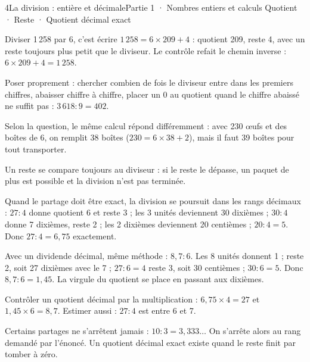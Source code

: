 \begin{ouverture}[calcul]{4}{La division : entière et décimale}{Partie 1 · Nombres entiers et calculs}
{Quotient · Reste · Quotient décimal exact}
\end{ouverture}
\pagestyle{otMain}\essentiel\fontsize{11}{15}\selectfont
{}\label{cours-4-1}
\begin{definition}Diviser 1\,258 par 6, c’est écrire $1\,258=6\times209+4$ : quotient 209, reste 4, avec un reste toujours plus petit que le diviseur. Le contrôle refait le chemin inverse : $6\times209+4=1\,258$.\end{definition}
\begin{savoirfaire}Poser proprement : chercher combien de fois le diviseur entre dans les premiers chiffres, abaisser chiffre à chiffre, placer un 0 au quotient quand le chiffre abaissé ne suffit pas : $3\,618:9=402$.\end{savoirfaire}
\begin{exemple}Selon la question, le même calcul répond différemment : avec 230 œufs et des boîtes de 6, on remplit 38 boîtes ($230=6\times38+2$), mais il faut 39 boîtes pour tout transporter.\end{exemple}
\begin{attention}Un reste se compare toujours au diviseur : si le reste le dépasse, un paquet de plus est possible et la division n’est pas terminée.\end{attention}
\clearpage
{}\label{cours-4-2}
\begin{definition}Quand le partage doit être exact, la division se poursuit dans les rangs décimaux : $27:4$ donne quotient 6 et reste 3 ; les 3 unités deviennent 30 dixièmes ; $30:4$ donne 7 dixièmes, reste 2 ; les 2 dixièmes deviennent 20 centièmes ; $20:4=5$. Donc $27:4=6{,}75$ exactement.\end{definition}
\begin{exemple}Avec un dividende décimal, même méthode : $8{,}7:6$. Les 8 unités donnent 1 ; reste 2, soit 27 dixièmes avec le 7 ; $27:6=4$ reste 3, soit 30 centièmes ; $30:6=5$. Donc $8{,}7:6=1{,}45$. La virgule du quotient se place en passant aux dixièmes.\end{exemple}
\begin{savoirfaire}Contrôler un quotient décimal par la multiplication : $6{,}75\times4=27$ et $1{,}45\times6=8{,}7$. Estimer aussi : $27:4$ est entre 6 et 7.\end{savoirfaire}
\begin{attention}Certains partages ne s’arrêtent jamais : $10:3=3{,}333\ldots$ On s’arrête alors au rang demandé par l’énoncé. Un quotient décimal exact existe quand le reste finit par tomber à zéro.\end{attention}

